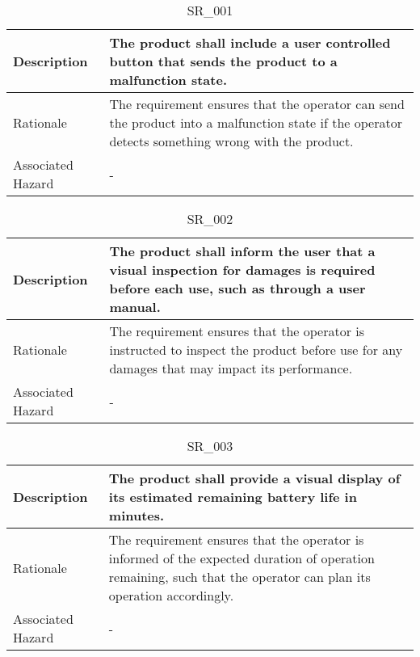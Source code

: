 \documentclass{article}
\begin{document}
\begin{table}[!h]
\begin{center}
\caption {SR\_001} 
\label{SR_001}
\begin{tabular}{ | m{3cm} | m{11cm} | }
\hline
Description & The product shall include a user controlled button that sends the product to a malfunction state.
 \\
\hline
Rationale & The requirement ensures that the operator can send the product into a malfunction state if the operator detects something wrong with the product. \\
\hline
Associated Hazard & - \\
\hline
\end{tabular}
\end{center}
\end{table}

\begin{table}[!h]
\begin{center}
\caption {SR\_002} 
\label{SR_002}
\begin{tabular}{ | m{3cm} | m{11cm} | }
\hline
Description & The product shall inform the user that a visual inspection for damages is required before each use, such as through a user manual.
 \\
\hline
Rationale & The requirement ensures that the operator is instructed to inspect the product before use for any damages that may impact its performance. \\
\hline
Associated Hazard & - \\
\hline
\end{tabular}
\end{center}
\end{table}

\begin{table}[!h]
\begin{center}
\caption {SR\_003} 
\label{SR_003}
\begin{tabular}{ | m{3cm} | m{11cm} | }
\hline
Description & The product shall provide a visual display of its estimated remaining battery life in minutes.
 \\
\hline
Rationale & The requirement ensures that the operator is informed of the expected duration of operation remaining, such that the operator can plan its operation accordingly. \\
\hline
Associated Hazard & - \\
\hline
\end{tabular}
\end{center}
\end{table}
\end{document}
